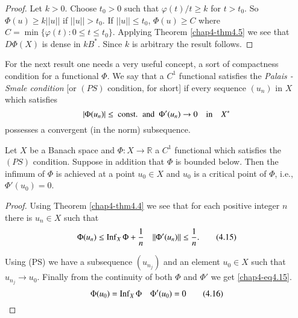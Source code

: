 \begin{proof}
Let $k>0$. Choose $t_{0}>0$ such that $\varphi(t)/t\geq k$ for
$t>t_{0}$. So $\Phi(u)\geq k||u||$ if $||u||>t_{0}$. If $||u||\leq
t_{0}$, $\Phi(u)\geq C$ where $C=\min \{\varphi(t):0\leq t\leq
t_{0}\}$. Applying Theorem \ref{chap4-thm4.5} we see that $D\Phi(X)$
is dense in $kB^{*}$. Since $k$ is arbitrary the result follows.
\end{proof}

For the next result one needs a very useful concept, a sort of
compactness condition for a functional $\Phi$. We say that a $C^{1}$
functional satisfies the {\em Palais - Smale condition} [or $(PS)$
  condition, for short] if every sequence $(u_{n})$ in $X$ which
satisfies 
$$
|\Phi(u_{n})|\leq \text{~const.~ and~ } \Phi'(u_{n})\to 0\quad\text{in}\quad
X^{*} 
$$
possesses a convergent (in the norm) subsequence.

\begin{theorem}\label{chap4-thm4.7}
Let $X$ be a Banach space and $\Phi:X\to \mathbb{R}$ a $C^{1}$
functional which satisfies the $(PS)$ condition. Suppose in addition
that $\Phi$ is bounded below. Then the infimum of $\Phi$ is achieved
at a point $u_{0}\in X$ and $u_{0}$ is a critical point of $\Phi$,
i.e., $\Phi'(u_{0})=0$.
\end{theorem}

\begin{proof}
Using Theorem \ref{chap4-thm4.4} we see that for each positive integer
$n$ there is $u_{n}\in X$ such that
\begin{equation*}
\Phi(u_{n})\leq \operatorname{Inf}_{X}\Phi+\frac{1}{n}\quad ||\Phi'(u_{n})||\leq
\frac{1}{n}.\tag{4.15}\label{chap4-eq4.15}
\end{equation*}

Using (PS) we have a subsequence $(u_{n_{j}})$ and an element
$u_{0}\in X$ such that $u_{n_{j}}\to u_{0}$. Finally from the
continuity of both $\Phi$ and $\Phi'$ we get \eqref{chap4-eq4.15}. 
\begin{equation*}
\Phi(u_{0})=\operatorname{Inf}_{X}\Phi\quad \Phi'(u_{0})=0\tag{4.16}\label{chap4-eq4.16}
\end{equation*}
\end{proof}


